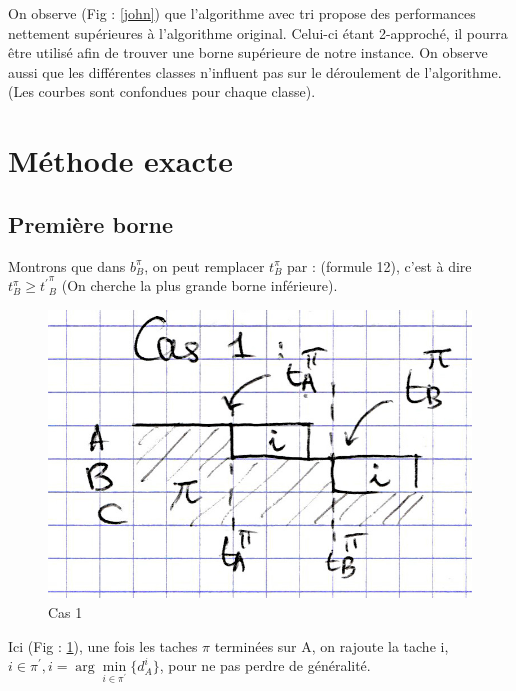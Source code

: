 \documentclass[12pt]{article}
\begin{document}
On observe (Fig : \ref{john}) que l'algorithme avec tri propose des performances nettement supérieures à l'algorithme original.
Celui-ci étant 2-approché, il pourra être utilisé afin de trouver une borne supérieure de notre instance.
On observe aussi que les différentes classes n'influent pas sur le déroulement de l'algorithme. (Les courbes sont confondues pour chaque classe).

\clearpage
\newpage
\section{Méthode exacte}

\subsection{Première borne}

Montrons que dans $b_B^\pi$, on peut remplacer $t_B^\pi$ par :
(formule 12), c'est à dire $t_B^\pi \ge {t^\prime}_B^\pi$ (On cherche la plus grande borne inférieure).

\begin{figure}[!ht]
\centering
\centerline{\includegraphics[scale=1]{5.jpg}}
\caption{Cas 1}
\label{cas11}
\end{figure}

Ici (Fig : \ref{cas11}), une fois les taches $\pi$ terminées sur A, on rajoute la tache i, $i\in{\pi}^\prime,i = {\arg\min\limits_{i\in{\pi^\prime}}}\{d_A^i\}$, pour ne pas perdre de généralité.
\end{document}
